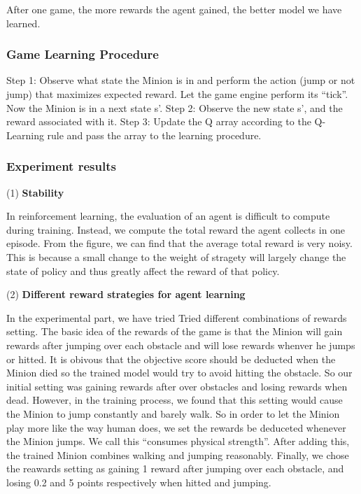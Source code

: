 \documentclass{acmsiggraph}
\begin{document}
After one game, the more rewards the agent gained, the better model we have learned.

\subsubsection{Game Learning Procedure}

Step 1: Observe what state the Minion is in and perform the action (jump or not jump) that maximizes expected reward. Let the game engine perform its “tick”. Now the Minion is in a next state s’.
Step 2: Observe the new state s’, and the reward associated with it.
Step 3: Update the Q array according to the Q-Learning rule and pass the array to the learning procedure.


\subsubsection{Experiment results}
(1) \textbf{Stability}

In reinforcement learning, the evaluation of an agent is difficult to compute during training. Instead, we compute the total reward the agent collects in one episode. From the figure, we can find that the average total reward is very noisy. This is because a small change to the weight of stragety will largely change the state of policy and thus greatly affect the reward of that policy. 

(2) \textbf{Different reward strategies for agent learning}

In the experimental part, we have tried Tried different combinations of rewards setting. The basic idea of the rewards of the game is that the Minion will gain rewards after jumping over each obstacle and will lose rewards whenver he jumps or hitted. It is obivous that the objective score should be deducted when the Minion died so the trained model would try to avoid hitting the obstacle. So our initial setting was gaining rewards after over obstacles and losing rewards when dead. However, in the training process, we found that this setting would cause the Minion to jump constantly and barely walk. So in order to let the Minion play more like the way human does, we set the rewards be deduceted whenever the Minion jumps. We call this “consumes physical strength”. After adding this, the trained Minion combines walking and jumping reasonably. Finally, we chose the reawards setting as gaining 1 reward after jumping over each obstacle, and losing 0.2 and 5 points respectively when hitted and jumping. 
\end{document}
